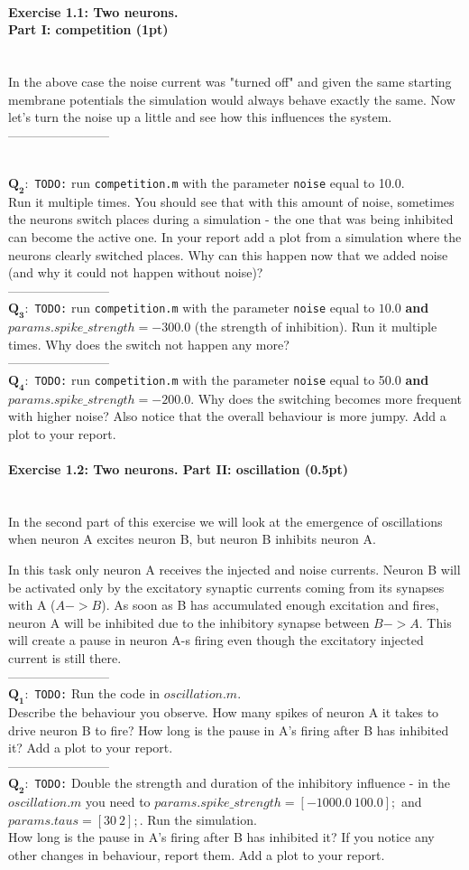 \documentclass[a4paper,11pt]{article}
\newenvironment{exercise}[3]{\paragraph{Exercise #1: #2 (#3pt)}\ \\}{
\medskip}
\newcommand{\question}[2]{\setlength\parindent{10mm}\ \\$\mathbf{Q_#1:}$ #2\ \\}
\begin{document}
\begin{exercise}{1.1}{Two neurons. \\Part I: competition}{1}
In the above case the noise current was "turned off" and given the same starting membrane potentials the simulation would always behave exactly the same. Now let's turn the noise up a little and see how this influences the system.\\
------------------------

\question{2}{ 
\texttt{TODO:} run \texttt{competition.m} with the parameter \texttt{noise} equal to 10.0.\\ 
Run it multiple times. You should see that with this amount of noise, sometimes the neurons switch places during a simulation - the one that was being inhibited can become the active one. In your report add a plot from a simulation where the neurons clearly switched places. Why can this happen now that we added noise (and why it could not happen without noise)?}
------------------------
\question{3}{ 
\texttt{TODO:} run \texttt{competition.m} with the parameter \texttt{noise} equal to $10.0$ \textbf{and} $params.spike\_strength = -300.0$ (the strength of inhibition).
Run it multiple times. Why does the switch not happen any more?}
------------------------
\question{4}{ 
\texttt{TODO:} run \texttt{competition.m} with the parameter \texttt{noise} equal to 50.0 \textbf{and} $params.spike\_strength = -200.0$.
Why does the switching becomes more frequent with higher noise? Also notice that the overall behaviour is more jumpy. Add a plot to your report.}

\end{exercise}

\begin{exercise}{1.2}{Two neurons. Part II: oscillation}{0.5}
In the second part of this exercise we will look at the emergence of oscillations when neuron A excites neuron B, but neuron B inhibits neuron A.

In this task only neuron A receives the injected and noise currents. Neuron B will be activated only by the excitatory synaptic currents coming from its synapses with A ($A->B$). As soon as B has accumulated enough excitation and fires, neuron A will be inhibited due to the inhibitory synapse between $B->A$. This will create a pause in neuron A-s firing even though the excitatory injected current is still there.\\
------------------------
\question{1}{\texttt{TODO:} Run the code in $oscillation.m$.\\ Describe the behaviour you observe. How many spikes of neuron A it takes to drive neuron B to fire? How long is the pause in A's firing after B has inhibited it? Add a plot to your report.}
------------------------
\question{2}{ \texttt{TODO:} Double the strength and duration of the inhibitory influence - in the $oscillation.m$ you need to $params.spike\_strength=[-1000.0\ 100.0];$ and $params.taus = [30\ 2];$. Run the simulation.\\ How long is the pause in A's firing after B has inhibited it? If you notice any other changes in behaviour, report them. Add a plot to your report.}


\end{exercise}
\end{document}
